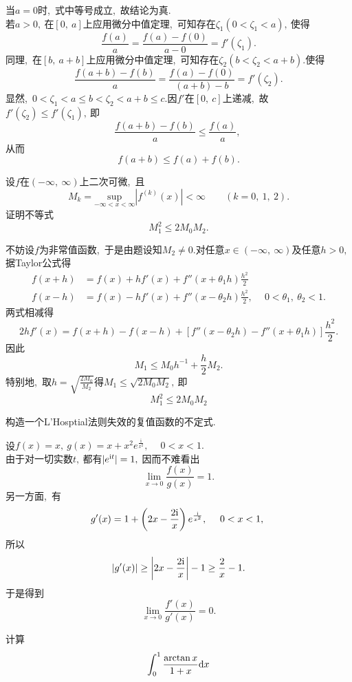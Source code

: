 	\begin{solution}
		当$a=0$时,\ 式中等号成立,\ 故结论为真.\\
		若$a>0,\ $在$\left[0,\ a\right]$上应用微分中值定理,\ 可知存在$\zeta_1(0<\zeta_1<a),\ $使得
		$$\frac{f(a)}{a}=\frac{f(a)-f(0)}{a-0}=f'(\zeta_1).$$
		同理,\ 在$\left[b,\ a+b\right]$上应用微分中值定理,\ 可知存在$\zeta_2(b<\zeta_2<a+b).$使得
		$$\frac{f(a+b)-f(b)}{a}=\frac{f(a)-f(0)}{(a+b)-b}=f'(\zeta_2).$$
		显然,\ $0<\zeta_1<a\le b<\zeta_2<a+b\le c.$因$f'$在$\left[0,\ c\right]$上递减,\ 故$f'(\zeta_2)\le f'(\zeta_1),\ $即
		$$\frac{f(a+b)-f(b)}{a}\le \frac{f(a)}{a},\ $$
		从而
		$$f(a+b)\le f(a)+f(b).$$ 
	\end{solution}
	\newpage
	\begin{problem}
		设$f$在$\left(-\infty,\ \infty\right)$上二次可微,\ 且
		$$M_k=\underset{-\infty<x<\infty}{\text{sup}} |f^{(k)}(x)|<\infty\qquad(k=0,\ 1,\ 2).$$
		证明不等式
		$$M_1^{2}\le 2M_0M_2.$$
	\end{problem}
	\begin{solution}
		不妨设$f$为非常值函数,\ 于是由题设知$M_2\neq 0.$对任意$x\in \left(-\infty,\ \infty\right)$及任意$h>0,\ $据Taylor公式得
		\begin{align*}
			f(x+h)&=f(x)+hf'(x)+f''(x+\theta_1h)\frac{h^2}{2}\\
			f(x-h)&=f(x)-hf'(x)+f''(x-\theta_2h)\frac{h^2}{2},\ \quad0<\theta_1,\ \theta_2<1.
		\end{align*}
		两式相减得
		$$2hf'(x)=f(x+h)-f(x-h)+\left[f''(x-\theta_2h)-f''(x+\theta_1h)\right]\frac{h^2}{2}.$$
		因此
		$$M_1\le M_0h^{-1}+\frac{h}{2}M_2.$$
		特别地,\ 取$h=\sqrt{\frac{2M_0}{M_2}}$得$M_1\le\sqrt{2M_0M_2},\ $即
		$$M_1^2\le 2M_0M_2$$ 
	\end{solution}
	\newpage
	\begin{problem}
		构造一个L'Hosptial法则失效的复值函数的不定式.
	\end{problem}
	
	\begin{solution}
		设$f(x)=x,\ g(x)=x+x^2e^{\frac{\text{i}}{x^2}},\ \quad 0<x<1.$\\
		由于对一切实数$t,\ $都有$\left|e^{\text i t}\right|=1,\ $因而不难看出
		$$\lim\limits_{x\rightarrow 0}\frac{f(x)}{g(x)}=1.$$
		另一方面,\ 有
		$$g'(x)=1+\left(2x-\frac{2\text i}{x}\right)e^{\frac{\text i}{x^2}},\ \quad 0< x<1,\ $$
		所以
		$$\left|g'(x)\right|\ge \left|2x-\frac{2\text i}{x}\right|-1\ge \frac{2}{x}-1.$$
		于是得到
		$$\lim\limits_{x\rightarrow0}\frac{f'(x)}{g'(x)}=0.$$ 
	\end{solution}
	\newpage
	\begin{problem}
		计算$$\int_{0}^{1}\frac{\arctan x}{1+x}\text d x$$
	\end{problem}
	
